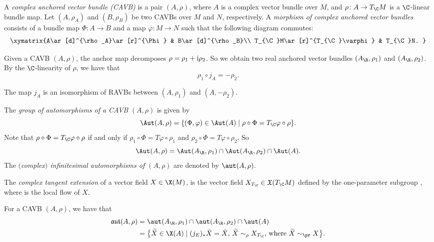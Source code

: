 \begin{Definition}
 A {\em complex anchored vector bundle (CAVB)} is a pair $(A,\rho)$, where $A$ is a complex vector bundle over $M$, and $\rho\colon A\to T_{\C}M$ is a $\C$-linear bundle map. Let $(A,\rho_A)$ and $(B,\rho_B)$ be two CAVBs over $M$ and $N$, respectively. A {\em morphism of complex anchored vector bundles} consists of a bundle map $\Phi\colon A\to B$ and a map $\varphi\colon M\to N$ such that the following diagram commutes:
\[\xymatrix{A\ar[d]^{\rho_A}\ar[r]^{\Phi} & B\ar[d]^{\rho_B}\\ T_{\C}M\ar[r]^{T_{\C}\varphi} & T_{\C}N.
}\]

\end{Definition}
Given a CAVB $(A, \rho)$, the anchor map decomposes $\rho=\rho_1+{\rm i}\rho_2$. So we obtain two real anchored vector bundles $(A_{\R},\rho_1)$ and $(A_{\R}, \rho_2)$. By the $\C$-linearity of $\rho$, we have that
\[\rho_1 \circ j_A=-\rho_2.\]
\begin{Proposition}
The map $j_A$ is an isomorphism of RAVBs between $(A, \rho_1)$ and $(A,-\rho_2)$.
\end{Proposition}
 The {\em group of automorphisms of a CAVB} $(A,\rho)$ is given by
 \[\Aut(A,\rho)=\{(\Phi, \varphi)\in \Aut(A)\mid \rho\circ\Phi=T_{\C}\varphi\circ \rho\}.\]
 Note that $\rho\circ\Phi=T_{\C}\varphi\circ \rho$ if and only if $\rho_1\circ \Phi=T\varphi\circ \rho_1$ and $\rho_2\circ \Phi=T\varphi\circ \rho_2$. So
 \[\Aut(A,\rho)=\Aut(A_{\R},\rho_1)\cap \Aut(A_{\R},\rho_2)\cap \Aut (A).\]
 The {\em $($complex$)$ infinitesimal automorphisms of $(A,\rho)$} are denoted by $\aut(A,\rho)$.
\begin{Definition}\label{cx_tangent_extension}
   The {\em complex tangent extension} of a vector field $X\in \X(M)$, is the vector field $X_{T_{\C}}\in \mathfrak{X}(T_{\C}M)$ defined by the one-parameter subgroup , where  is the local flow of $X$.
\end{Definition}

For a CAVB $(A,\rho)$, we have that
\begin{align*}
\mathfrak{aut}(A,\rho)&{}=\aut(A_{\R},\rho_1)\cap \aut(A_{\R},\rho_2)\cap \aut(A)\\
&{}=\bigl\{\widetilde{X}\in \X(A)\mid (j_E)_* \hat{X}=\hat{X},\, \widetilde{X}\sim_{\rho} X_{T_{\C}},\, \text{where}\ \widetilde{X}\sim_{\pr} X\bigr\}.
\end{align*}



